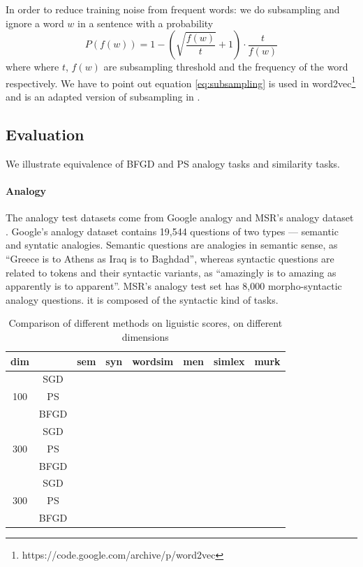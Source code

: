\documentclass[letterpaper]{article} %
\begin{document}
In order to reduce training noise from frequent words: we do subsampling and ignore a word $w$ in a sentence with a probability
\begin{equation}
P(f(w))= 1-(\sqrt{\frac{f(w)}{t}}+1)\cdot\frac{t}{f(w)}\label{eq:subsampling}
\end{equation}
where where $t$, $f(w)$ are subsampling threshold and the frequency of the word respectively. We have to point out equation \ref{eq:subsampling} is used in word2vec\footnote{https://code.google.com/archive/p/word2vec} and is an adapted version of subsampling in \cite{NIPS2013_5021}.
\subsection{Evaluation}
We illustrate equivalence of BFGD and PS analogy tasks and similarity tasks.
\paragraph{Analogy} The analogy test datasets come from Google analogy \cite{NIPS2013_5021} and MSR's analogy dataset \cite{mikolov2013linguistic}.  Google’s analogy dataset  contains 19,544 questions of two types --- semantic and syntatic analogies. Semantic questions are analogies in semantic sense, as ``Greece  is to Athens as Iraq is to Baghdad'', whereas syntactic questions are related to tokens and their syntactic variants, as ``amazingly is to amazing as apparently is to apparent''. MSR's analogy test set has 8,000 morpho-syntactic analogy questions. it is composed of the syntactic kind of tasks.
\begin{table}[]
\begin{tabular}{|c|c|c|c|c|c|c|c|}
\hline
   dim      &      & sem & syn & wordsim & men & simlex & murk \\ \hline

\multirow{3}{*}{100} & SGD   &     &     &         &     &        &      \\ \cline{2-8} 
					 & PS   &     &     &         &     &        &      \\ \cline{2-8} 
                     & BFGD &     &     &         &     &        &      \\ \hline
\multirow{3}{*}{300} & SGD   &     &     &         &     &        &      \\ \cline{2-8} 
					 & PS   &     &     &         &     &        &      \\ \cline{2-8} 
                     & BFGD &     &     &         &     &        &      \\ \hline
\multirow{3}{*}{300} & SGD   &     &     &         &     &        &      \\ \cline{2-8} 
					 & PS   &     &     &         &     &        &      \\ \cline{2-8} 
                     & BFGD &     &     &         &     &        &      \\
\hline
\end{tabular}
\caption{Comparison of different methods on liguistic scores, on different dimensions}
\end{table}
\end{document}
